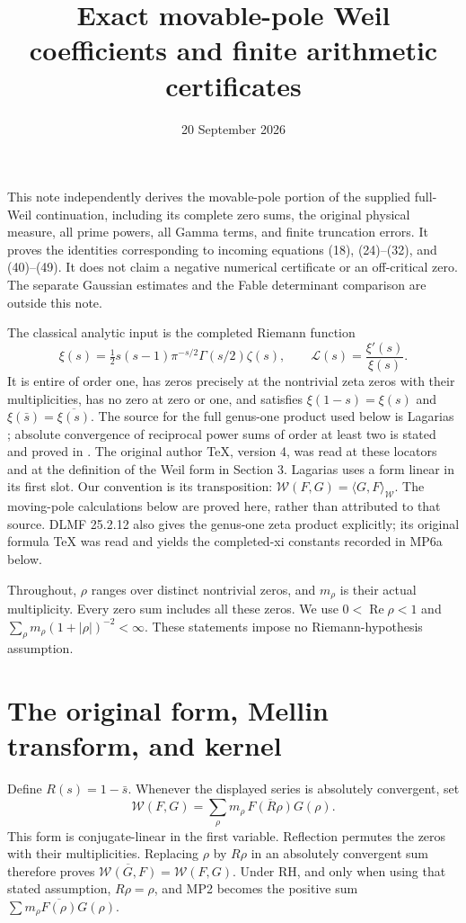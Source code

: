 \documentclass[11pt]{article}
\title{Exact movable-pole Weil coefficients and finite arithmetic certificates}
\author{}
\date{20 September 2026}
\newcommand{\W}{\mathcal W}
\newcommand{\LL}{\mathscr L}
\newcommand{\Rea}{\operatorname{Re}}
\begin{document}
\maketitle

This note independently derives the movable-pole portion of the supplied
full-Weil continuation, including its complete zero sums, the original
physical measure, all prime powers, all Gamma terms, and finite truncation
errors. It proves the identities corresponding to incoming equations
(18), (24)--(32), and (40)--(49). It does not claim a negative numerical
certificate or an off-critical zero. The separate Gaussian estimates and
the Fable determinant comparison are outside this note.

The classical analytic input is the completed Riemann function
\begin{equation}
 \xi(s)=\tfrac12s(s-1)\pi^{-s/2}\Gamma(s/2)\zeta(s),\qquad
 \LL(s)=\frac{\xi'(s)}{\xi(s)}.\tag{MP1}
\end{equation}
It is entire of order one, has zeros precisely at the nontrivial zeta zeros
with their multiplicities, has no zero at zero or one, and satisfies
$\xi(1-s)=\xi(s)$ and $\xi(\bar s)=\overline{\xi(s)}$.
The source for the full genus-one product used below is Lagarias
\cite[Lemma 4.1 and its proof]{Lagarias}; absolute convergence of reciprocal
power sums of order at least two is stated and proved in
\cite[Lemma 2.1]{Lagarias}. The original author TeX, version 4, was read at
these locators and at the definition of the Weil form in Section 3.
Lagarias uses a form linear in its first slot. Our convention is its
transposition: $\W(F,G)=\langle G,F\rangle_{\mathcal W}$.
The moving-pole calculations below are proved here, rather than attributed
to that source. DLMF 25.2.12 \cite{DLMFProduct} also gives the
genus-one zeta product explicitly; its original formula TeX was read
and yields the completed-xi constants recorded in MP6a below.

Throughout, $\rho$ ranges over distinct nontrivial zeros, and $m_\rho$ is
their actual multiplicity. Every zero sum includes all these zeros.
We use $0<\Rea\rho<1$ and
$\sum_\rho m_\rho(1+|\rho|)^{-2}<\infty$. These statements impose no
Riemann-hypothesis assumption.

\section{The original form, Mellin transform, and kernel}
Define $R(s)=1-\bar s$. Whenever the displayed series is absolutely
convergent, set
\begin{equation}
 \W(F,G)=\sum_\rho m_\rho\,\overline{F(R\rho)}G(\rho).
 \tag{MP2}
\end{equation}
This form is conjugate-linear in the first variable. Reflection permutes
the zeros with their multiplicities. Replacing $\rho$ by $R\rho$ in an
absolutely convergent sum therefore proves
$\overline{\W(G,F)}=\W(F,G)$. Under RH, and only when using that stated
assumption, $R\rho=\rho$, and MP2 becomes the positive sum
$\sum m_\rho\overline{F(\rho)}G(\rho)$.
\end{document}

